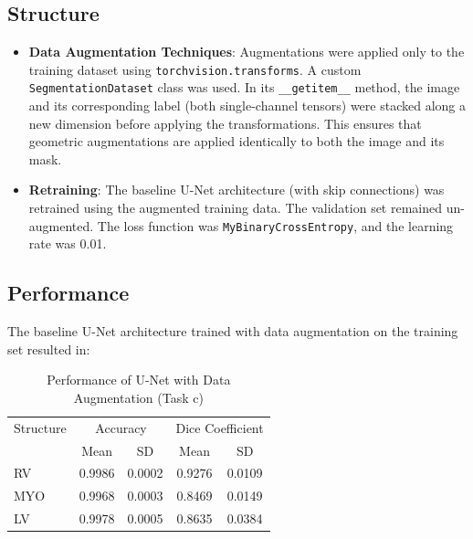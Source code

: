 \documentclass{article}
\begin{document}
\subsection{Structure}
\begin{itemize}
  \item \textbf{Data Augmentation Techniques}: Augmentations were applied only to the training dataset using
        \texttt{torchvision.transforms}. A custom \texttt{SegmentationDataset} class was used. In its \texttt{\_\_getitem\_\_} method,
        the image and its corresponding label (both single-channel tensors) were stacked along a new dimension before applying the
        transformations. This ensures that geometric augmentations are applied identically to both the image and its mask.
  \item \textbf{Retraining}: The baseline U-Net architecture (with skip connections) was retrained using the augmented training data.
        The validation set remained un-augmented. The loss function was \texttt{MyBinaryCrossEntropy}, and the learning rate was 0.01.
\end{itemize}

\subsection{Performance}
The baseline U-Net architecture trained with data augmentation on the training set resulted in:
\begin{table}[H]
  \centering
  \caption{Performance of U-Net with Data Augmentation (Task c)}
  \label{tab:data_aug_unet}
  \begin{tabular}{l|cc|cc}
    \toprule
    \multicolumn{1}{c|}{Structure} & \multicolumn{2}{c|}{Accuracy} & \multicolumn{2}{c}{Dice Coefficient}                   \\
                                   & Mean                          & SD                                   & Mean   & SD     \\
    \midrule
    RV                             & 0.9986                        & 0.0002                               & 0.9276 & 0.0109 \\
    MYO                            & 0.9968                        & 0.0003                               & 0.8469 & 0.0149 \\
    LV                             & 0.9978                        & 0.0005                               & 0.8635 & 0.0384 \\
    \bottomrule
  \end{tabular}
\end{table}
\end{document}
